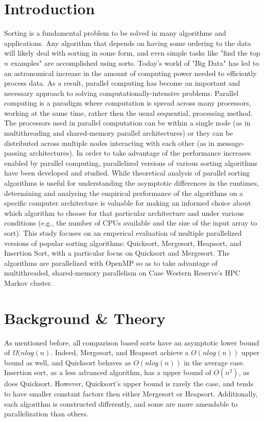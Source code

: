 \documentclass[conference]{IEEEtran}
\begin{document}
\section{Introduction}
Sorting is a fundamental problem to be solved in many algorithms and applications.
Any algorithm that depends on having some ordering to the data will likely deal with sorting in some form, and even simple tasks like "find the top $n$ examples" are accomplished using sorts. 
Today's world of "Big Data" has led to an astronomical increase in the amount of computing power needed to efficiently process data.
As a result, parallel computing has become an important and necessary approach to solving computationally-intensive problems.
Parallel computing is a paradigm where computation is spread across many processors, working at the same time, rather then the usual sequential, processing method.
The processors used in parallel computation can be within a single node (as in multithreading and shared-memory parallel architectures) or they can be distributed across multiple nodes interacting with each other (as in message-passing architectures).
In order to take advantage of the performance increases enabled by parallel computing, parallelized versions of various sorting algorithms have been developed and studied. While theoretical analysis of parallel sorting algorithms is useful for understanding the asymptotic differences in the runtimes, determining and analysing the empirical performance of the algorithms on a specific computer architecture is valuable for making an informed choice about which algorithm to choose for that particular architecture and under various conditions (e.g., the number of CPUs available and the size of the input array to sort).
This study focuses on an emperical evaluation of multiple parallelized versions of popular sorting algorithms: Quicksort, Mergesort, Heapsort, and Insertion Sort, with a particular focus on Quicksort and Mergesort. The algorithms are parallelized with OpenMP so as to take advantage of multithreaded, shared-memory parallelism on Case Western Reserve's HPC Markov cluster.

\section{Background \& Theory}
As mentioned before, all comparison based sorts have an asymptotic lower bound of $\Omega(nlog(n)$. 
Indeed,  Mergesort, and Heapsort achieve a $O(nlog(n))$ upper bound as well, and Quicksort behaves as $O(nlog(n))$ in the average case. 
Insertion sort, as a less advanced algorithm, has a upper bound of $O(n^2)$, as does Quicksort. \cite{cormen_introduction_2009} 
However, Quicksort's upper bound is rarely the case, and tends to have smaller constant factors then either Mergesort or Heapsort. \cite{hoare_algorithm_1961} %
Additionally, each algorithm is constructed differently, and some are more amendable to parallelization than others. 
\end{document}
